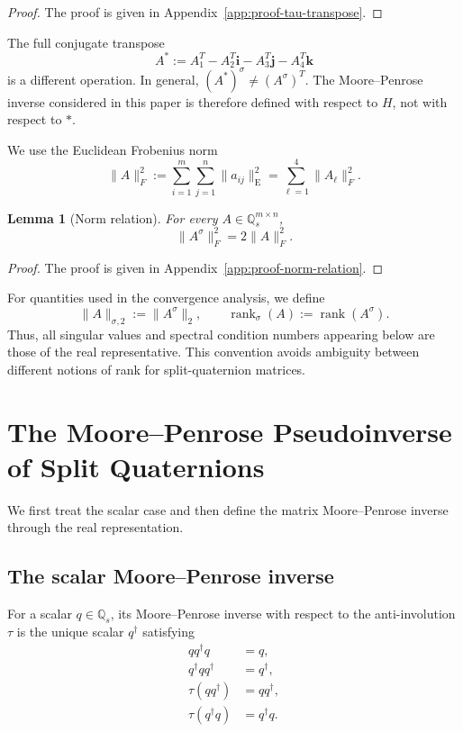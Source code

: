 \documentclass[12pt,a4paper]{article}
\theoremstyle{plain}
\newtheorem{lemma}[theorem]{Lemma}
\theoremstyle{definition}
\theoremstyle{remark}
\begin{document}
\begin{proof}
The proof is given in Appendix~\ref{app:proof-tau-transpose}.
\end{proof}

The full conjugate transpose
\[
    A^*:=A_1^T-A_2^T\mathbf{i}-A_3^T\mathbf{j}-A_4^T\mathbf{k}
\]
is a different operation. In general, \((A^*)^\sigma\neq(A^\sigma)^T\). The Moore--Penrose inverse considered in this paper is therefore defined with respect to \(H\), not with respect to \(*\).

We use the Euclidean Frobenius norm
\begin{equation}\label{eq:sq_frobenius}
    \|A\|_F^2 :=\sum_{i=1}^m\sum_{j=1}^n\|a_{ij}\|_{\mathrm E}^2 =\sum_{\ell=1}^4\|A_\ell\|_F^2.
\end{equation}

\begin{lemma}[Norm relation] \label{lem:norm_relation}
For every \(A\in\mathbb{Q}_s^{m\times n}\),
\begin{equation}\label{eq:norm_relation}
    \|A^\sigma\|_F^2=2\|A\|_F^2.
\end{equation}
\end{lemma}

\begin{proof}
The proof is given in Appendix~\ref{app:proof-norm-relation}.
\end{proof}

For quantities used in the convergence analysis, we define
\[
    \|A\|_{\sigma,2}:=\|A^\sigma\|_2, \qquad \operatorname{rank}_\sigma(A):=\operatorname{rank}(A^\sigma).
\]
Thus, all singular values and spectral condition numbers appearing below are those of the real representative. This convention avoids ambiguity between different notions of rank for split-quaternion matrices.


\section{The Moore--Penrose Pseudoinverse of Split Quaternions}\label{Sec:MP}
We first treat the scalar case and then define the matrix Moore--Penrose inverse through the real representation.

\subsection{The scalar Moore--Penrose inverse}
For a scalar \(q\in\mathbb{Q}_s\), its Moore--Penrose inverse with respect to the anti-involution \(\tau\) is the unique scalar \(q^\dagger\) satisfying
\begin{align}
    qq^\dagger q&=q,\label{eq:scalar_P1}\\
    q^\dagger q q^\dagger&=q^\dagger,\label{eq:scalar_P2}\\
    \tau(qq^\dagger)&=qq^\dagger,\label{eq:scalar_P3}\\
    \tau(q^\dagger q)&=q^\dagger q.\label{eq:scalar_P4}
\end{align}
\end{document}
